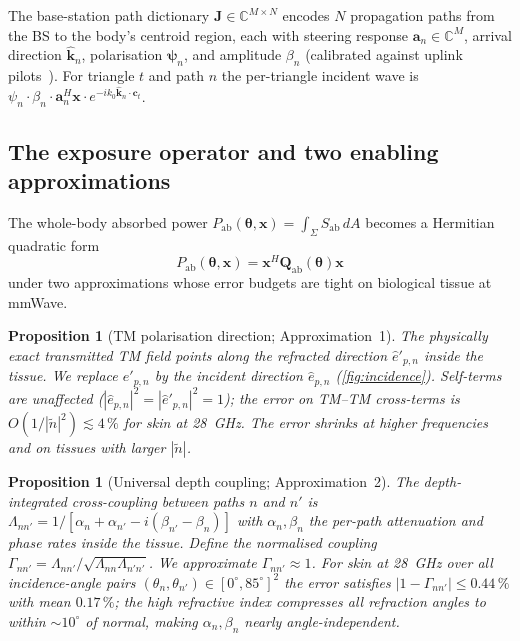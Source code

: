 \documentclass[journal,twocolumn,10pt]{IEEEtran}
\theoremstyle{plain}
\newtheorem{proposition}[theorem]{Proposition}
\theoremstyle{definition}
\theoremstyle{remark}
\newcommand{\xx}{\mathbf{x}}
\newcommand{\Sab}{S_{\mathrm{ab}}}
\newcommand{\Pabs}{P_{\mathrm{ab}}}
\newcommand{\Qabs}{\mathbf{Q}_{\mathrm{ab}}}
\newcommand{\Jmat}{\mathbf{J}}
\newcommand{\psin}{\bm{\psi}_n}
\newcommand{\thetab}{\bm{\theta}}
\newcommand{\Complex}{\mathbb{C}}
\newcommand{\ntilde}{\tilde{n}}
\begin{document}
The base-station path dictionary $\Jmat \in \Complex^{M \times N}$
encodes $N$ propagation paths from the BS to the body's centroid
region, each with steering response $\bm{a}_n \in \Complex^{M}$,
arrival direction $\hat{\bm{k}}_n$, polarisation $\psin$, and
amplitude $\beta_n$ (calibrated against
uplink pilots~\cite{Wydaeghe2026jsacv5}). For triangle $t$ and path
$n$ the per-triangle incident wave is $\psi_n \cdot \beta_n \cdot
\bm{a}_n^{H}\xx \cdot e^{-ik_0 \hat{\bm{k}}_n \cdot \bm{c}_t}$.

\subsection{The exposure operator and two enabling approximations}

The whole-body absorbed power $\Pabs(\thetab,\xx) = \int_{\Sigma}
\Sab\,dA$ becomes a Hermitian quadratic form
\begin{equation}\label{eq:Qabs}
\Pabs(\thetab,\xx) = \xx^{H} \Qabs(\thetab) \xx
\end{equation}
under two approximations whose error budgets are tight on biological
tissue at mmWave.

\begin{proposition}[TM polarisation direction; Approximation~1]\label{prop:approx1}
The physically exact transmitted TM field points along the refracted
direction $\hat{e}'_{p,n}$ inside the tissue. We replace
$\hat{e}'_{p,n}$ by the incident direction $\hat{e}_{p,n}$
(\cref{fig:incidence}). Self-terms are unaffected ($|\hat{e}_{p,n}|^2 =
|\hat{e}'_{p,n}|^2 = 1$); the error on TM--TM cross-terms is
$O(1/|\ntilde|^2) \lesssim 4\,\%$ for skin at 28~GHz. The error
shrinks at higher frequencies and on tissues with larger $|\ntilde|$.
\end{proposition}

\begin{proposition}[Universal depth coupling; Approximation~2]\label{prop:approx2}
The depth-integrated cross-coupling between paths $n$ and $n'$ is
$\Lambda_{nn'} = 1 / [\alpha_n + \alpha_{n'} - i(\beta_{n'} - \beta_n)]$
with $\alpha_n, \beta_n$ the per-path attenuation and phase rates
inside the tissue. Define the normalised coupling $\Gamma_{nn'} =
\Lambda_{nn'} / \sqrt{\Lambda_{nn}\Lambda_{n'n'}}$. We approximate
$\Gamma_{nn'} \approx 1$. For skin at 28~GHz over all incidence-angle
pairs $(\theta_n,\theta_{n'}) \in [0^{\circ},85^{\circ}]^2$ the error
satisfies $|1 - \Gamma_{nn'}| \leq 0.44\,\%$ with mean $0.17\,\%$;
the high refractive index compresses all refraction angles to within
$\sim\!10^{\circ}$ of normal, making $\alpha_n,\beta_n$ nearly
angle-independent.
\end{proposition}
\end{document}

